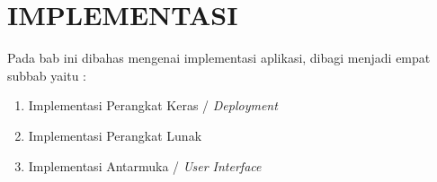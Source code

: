 \chapter{IMPLEMENTASI}
  Pada bab ini dibahas mengenai implementasi aplikasi, dibagi menjadi empat subbab yaitu :
  \begin{enumerate}
  	\item Implementasi Perangkat Keras / \textit{Deployment}
  	\item Implementasi Perangkat Lunak
  	\item Implementasi Antarmuka / \textit{User Interface}
  \end{enumerate}

  
  
  
  
  
